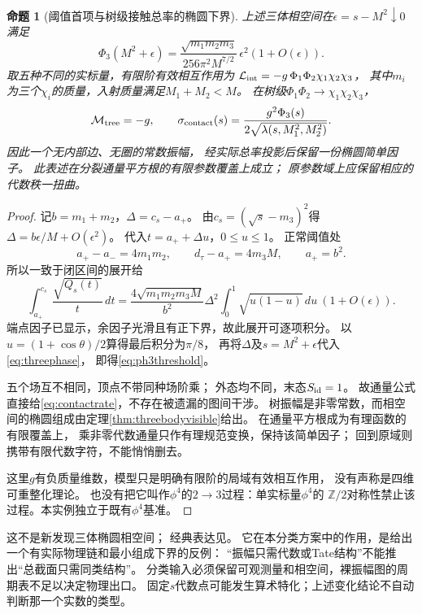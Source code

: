 \documentclass[11pt,a4paper]{ctexart}
\theoremstyle{cnplain}\newtheorem{theorem}{定理}[section]
\newtheorem{proposition}[theorem]{命题}
\theoremstyle{definition}\newtheorem{definition}[theorem]{定义}
\theoremstyle{remark}\newtheorem{remark}[theorem]{注}
\begin{document}
\begin{proposition}[阈值首项与树级接触总率的椭圆下界]\label{prop:contactphase}
上述三体相空间在$\epsilon=s-M^2\downarrow0$满足
\begin{equation}\label{eq:ph3threshold}
 \Phi_3(M^2+\epsilon)=
  \frac{\sqrt{m_1m_2m_3}}{256\pi^2 M^{7/2}}\,
       \epsilon^2(1+O(\epsilon)).
\end{equation}
取五种不同的实标量，有限阶有效相互作用为
$\mathcal L_{\rm int}=-g\,\Phi_1\Phi_2\chi_1\chi_2\chi_3$，
其中$m_i$为三个$\chi_i$的质量，入射质量满足$M_1+M_2<M$。
在树级$\Phi_1\Phi_2\to\chi_1\chi_2\chi_3$，
\begin{equation}\label{eq:contactrate}
 \mathcal M_{\rm tree}=-g,\qquad
 \sigma_{\rm contact}(s)=
       \frac{g^2\Phi_3(s)}{2\sqrt{\lambda(s,M_1^2,M_2^2)}}.
\end{equation}
因此一个无内部边、无圈的常数振幅，
经实际总率投影后保留一份椭圆简单因子。
此表述在分裂通量平方根的有限参数覆盖上成立；
原参数域上应保留相应的代数秩一扭曲。
\end{proposition}
\begin{proof}
记$b=m_1+m_2$，$\Delta=c_s-a_+$。
由$c_s=(\sqrt s-m_3)^2$得
$\Delta=b\epsilon/M+O(\epsilon^2)$。
代入$t=a_++\Delta u$，$0\le u\le1$。
正常阈值处
\[
 a_+-a_-=4m_1m_2,\qquad d_\tau-a_+=4m_3M,\qquad a_+=b^2.
\]
所以一致于闭区间的展开给
\[
 \int_{a_+}^{c_s}\frac{\sqrt{Q_s(t)}}t\,dt
 =\frac{4\sqrt{m_1m_2m_3M}}{b^2}\Delta^2
       \int_0^1\sqrt{u(1-u)}\,du\ (1+O(\epsilon)).
\]
端点因子已显示，余因子光滑且有正下界，故此展开可逐项积分。
以$u=(1+\cos\theta)/2$算得最后积分为$\pi/8$，
再将$\Delta$及$s=M^2+\epsilon$代入\eqref{eq:threephase}，
即得\eqref{eq:ph3threshold}。

五个场互不相同，顶点不带同种场阶乘；
外态均不同，末态$S_{\rm id}=1$。
故通量公式直接给\eqref{eq:contactrate}，不存在被遗漏的图间干涉。
树振幅是非零常数，而相空间的椭圆组成由定理\ref{thm:threebodyvisible}给出。
在通量平方根成为有理函数的有限覆盖上，
乘非零代数通量只作有理规范变换，保持该简单因子；
回到原域则携带有限代数字符，不能悄悄删去。

这里$g$有负质量维数，模型只是明确有限阶的局域有效相互作用，
没有声称是四维可重整化理论。
也没有把它叫作$\phi^4$的$2\to3$过程：单实标量$\phi^4$的
$\mathbb Z/2$对称性禁止该过程。本实例独立于既有$\phi^4$基准。
\end{proof}

这不是新发现三体椭圆相空间；
经典表达见\cite{DDphase}。
它在本分类方案中的作用，是给出一个有实际物理链和最小组成下界的反例：
“振幅只需代数或Tate结构”不能推出“总截面只需同类结构”。
分类输入必须保留可观测量和相空间，裸振幅图的周期表不足以决定物理出口。
固定$s$代数点可能发生算术特化；上述变化结论不自动判断那一个实数的类型。
\end{document}
